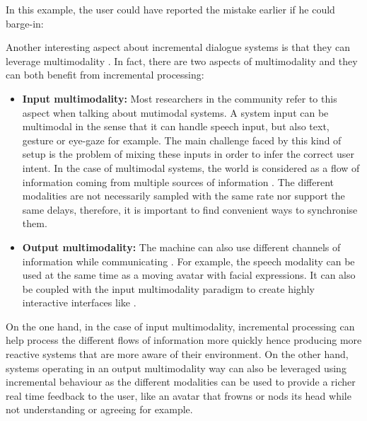 								In this example, the user could have reported the mistake earlier if he could barge-in:
								
								\begin{dialogue}
								\end{dialogue}
								
		Another interesting aspect about incremental dialogue systems is that they can leverage multimodality \cite{Fink1998}. In fact, there are two aspects of multimodality and they can both benefit from incremental processing:
								
		\begin{itemize}
		   \item \textbf{Input multimodality:} Most researchers in the community refer to this aspect when talking about mutimodal systems. A system input can be multimodal in the sense that it can handle speech input, but also text, gesture or eye-gaze for example. The main challenge faced by this kind of setup is the problem of mixing these inputs in order to infer the correct user intent. In the case of multimodal systems, the world is considered as a flow of information coming from multiple sources of information \cite{Chao2012,Rosenthal2013}. The different modalities are not necessarily sampled with the same rate nor support the same delays, therefore, it is important to find convenient ways to synchronise them.
		   \item \textbf{Output multimodality:} The machine can also use different channels of information while communicating \cite{Matthias2009}. For example, the speech modality can be used at the same time as a moving avatar with facial expressions. It can also be coupled with the input multimodality paradigm to create highly interactive interfaces like \cite{Johnston2014}.
		\end{itemize}

                On the one hand, in the case of input multimodality, incremental processing can help process the different flows of information more quickly hence producing more reactive systems that are more aware of their environment. On the other hand, systems operating in an output multimodality way can also be leveraged using incremental behaviour as the different modalities can be used to provide a richer real time feedback to the user, like an avatar that frowns or nods its head while not understanding or agreeing for example.


